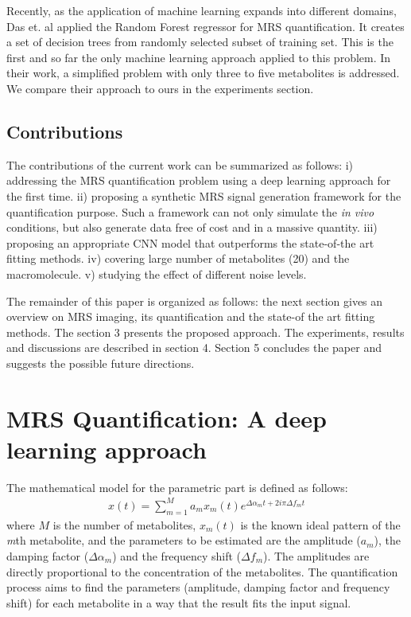 \documentclass{llncs}
\begin{document}
Recently, as the application of machine learning expands into different domains, Das et. al \cite{das2017} applied the Random Forest regressor for MRS quantification. It creates a set of decision trees from randomly selected subset of training set. This is the first and so far the only machine learning approach applied to this problem. In their work, a simplified problem with only three to five metabolites is addressed. We compare their approach to ours in the experiments section.

\subsection{Contributions}

The contributions of the current work can be summarized as follows: i) addressing the MRS quantification problem using a deep learning approach for the first time. ii) proposing a synthetic MRS signal generation framework for the quantification purpose. 
Such a framework can not only simulate the \textit{in vivo} conditions, %
but also generate data free of cost and in a massive quantity. %
iii) proposing an appropriate CNN model that outperforms the state-of-the art fitting methods. iv) covering large number of metabolites (20) and the macromolecule. v) studying the effect of different noise levels.

The remainder of this paper is organized as follows: the next section gives an overview on MRS imaging, its quantification and the state-of the art fitting methods. The section 3 presents the proposed approach. The experiments, results and discussions are described in section 4. Section 5 concludes the paper and suggests the possible future directions.   

\section{MRS Quantification: A deep learning approach}

The mathematical model for the parametric part is defined as follows: 
\begin{eqnarray}
    x(t)=\sum_{m=1}^{M}a_{m}x_{m}(t) e^{\Delta \alpha_{m}t+2i\pi \Delta f_{m}t} %
    \label{signalModel}
\end{eqnarray}
where $M$ is the number of metabolites, $x_{m}(t)$ is the known ideal pattern of the \emph{m}th metabolite,
and the parameters to be estimated are the amplitude ($a_{m}$), the damping factor ($\Delta \alpha_{m}$) and the frequency shift ($\Delta f_{m}$). %
The amplitudes are directly proportional to the concentration of the metabolites.
The quantification process aims to find the parameters (amplitude, damping factor and frequency shift) for each metabolite in a way that the result fits the input signal. %
\end{document}
